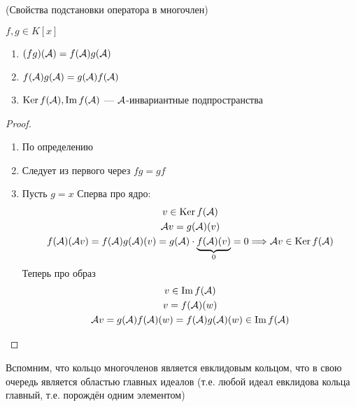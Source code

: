 \begin{theorem}(Свойства подстановки оператора в многочлен)

    $ f, g \in K[x] $
    \begin{enumerate}
        \item $ (fg)(\mathcal{A}) = f(\mathcal{A}) g(\mathcal{A}) $
        \item $ f(\mathcal{A}) g(\mathcal{A}) = g(\mathcal{A}) f(\mathcal{A}) $
        \item $ \operatorname{Ker} f(\mathcal{A}) , \operatorname{Im} f(\mathcal{A})$  ---  $\mathcal{A} $-инвариантные подпространства
    \end{enumerate}
    \begin{proof} \quad
    
    \begin{enumerate}
        \item По определению
        \item Следует из первого через $fg = gf$
        \item Пусть $g = x$
        \quad Сперва про ядро: \\
        \begin{gather*}
            v \in \operatorname{Ker} f(\mathcal{A}) \\
            \mathcal{A} v = g(\mathcal{A}) (v) \\
            f(\mathcal{A}) (\mathcal{A} v) = f(\mathcal{A}) g(\mathcal{A}) (v) = g(\mathcal{A}) \cdot \underbrace{f(\mathcal{A}) (v)}_{\text{$ 0 $}} = 0 \Longrightarrow \mathcal{A} v \in \operatorname{Ker} f(\mathcal{A}) \\
        \end{gather*}
        \quad Теперь про образ \\
        \begin{gather*}
            v \in \operatorname{Im} f(\mathcal{A}) \\
            v = f(\mathcal{A}) (w) \\
            \mathcal{A} v = g(\mathcal{A}) f(\mathcal{A}) (w) = f(\mathcal{A}) g(\mathcal{A}) (w) \in \operatorname{Im} f(\mathcal{A})
        \end{gather*}
    \end{enumerate}
    \end{proof}
\end{theorem}

Вспомним, что кольцо многочленов является евклидовым кольцом, что в свою очередь является областью главных идеалов (т.е. любой идеал евклидова кольца главный, т.е. порождён одним элементом)

